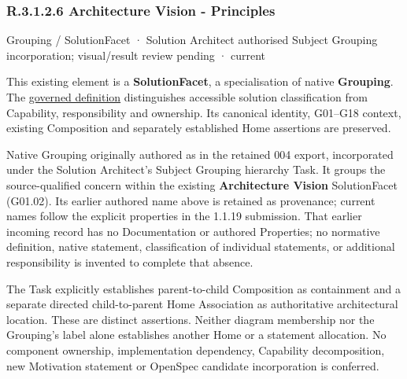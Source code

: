 \subsubsection*{R.3.1.2.6 Architecture Vision - Principles}
\label{navigation:R.3.1.2.6}

\label{element:87694e76de1d4b93af63a16a9f5de128}
{\small Grouping / SolutionFacet · Solution Architect authorised Subject Grouping incorporation; visual/result review pending · current}\par

This existing element is a \textbf{SolutionFacet}, a specialisation of native
\textbf{Grouping}. The \href{\detokenize{../../../../../../../governance/continuum-representation.md#solutionfacet-classification--1119-candidate}}{governed definition}
distinguishes accessible solution classification from Capability, responsibility
and ownership. Its canonical identity, G01–G18 context, existing Composition
and separately established Home assertions are preserved.



Native Grouping originally authored as \texttt{} in the retained 004 export,
incorporated under the Solution Architect's Subject Grouping hierarchy Task.
It groups the source-qualified \texttt{} concern within
the existing \textbf{Architecture Vision} SolutionFacet (G01.02). Its earlier authored name above is retained as provenance; current names
follow the explicit properties in the 1.1.19 submission.
That earlier incoming record has no Documentation or authored Properties; no normative
definition, native statement, classification of individual statements, or
additional responsibility is invented to complete that absence.



The Task explicitly establishes parent-to-child Composition as containment and
a separate directed child-to-parent Home Association as authoritative architectural
location. These are distinct assertions. Neither diagram membership nor the
Grouping's label alone establishes another Home or a statement allocation.
No component ownership, implementation dependency, Capability decomposition,
new Motivation statement or OpenSpec candidate incorporation is conferred.



